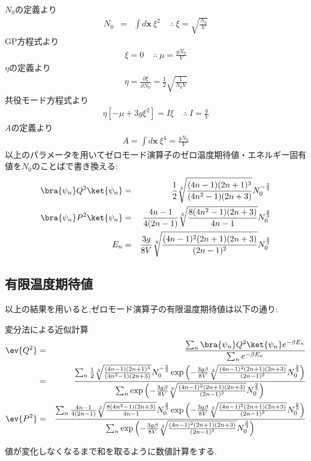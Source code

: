 \documentclass[10.5pt,a4paper]{jreport}
\begin{document}
$N_0$の定義より
\begin{eqnarray}
  N_0 &=& \int d\bm{x}\ \xi^2 \ \ \ \ \ \therefore\ \xi = \sqrt{\frac{N_0}{V}}
\end{eqnarray}
GP方程式より
\begin{eqnarray}
  [-\mu +g\xi^2]\xi = 0\ \ \ \ \ \therefore\ \mu = \frac{gN_0}{V}
\end{eqnarray}
$\eta$の定義より
\begin{eqnarray}
  \eta = \frac{\partial\xi}{\partial N_0} = \frac{1}{2}\sqrt{\frac{1}{N_0V}}
\end{eqnarray}
共役モード方程式より
\begin{eqnarray}
  \eta[-\mu + 3g\xi^2] = I\xi\ \ \ \ \ \therefore\ I = \frac{g}{V}
\end{eqnarray}
$A$の定義より
\begin{eqnarray}
  A = \int d\bm{x}\ \xi^4 = \frac{gN_0}{V}
\end{eqnarray}
以上のパラメータを用いてゼロモード演算子のゼロ温度期待値・エネルギー固有値を$N_0$のことばで書き換える:
\begin{eqnarray}
  \bra{\psi_n}Q^2\ket{\psi_n} &=& \frac{1}{2}{\sqrt[3]{\frac{(4n-1)(2n+1)^3}{(4n^2-1)(2n+3)}}}N_0^{-\frac{2}{3}}\\
  \bra{\psi_n}P^2\ket{\psi_n} &=& \frac{4n-1}{4(2n-1)}{\sqrt[3]{\frac{8(4n^2-1)(2n+3)}{4n-1}}}N_0^{\frac{2}{3}}\\
  E_n &=& \frac{3g}{8V}{\sqrt[3]{\frac{(4n-1)^2(2n+1)(2n+3)}{(2n-1)^2}}}N_0^{\frac{2}{3}}
\end{eqnarray}
\subsection{有限温度期待値}
以上の結果を用いると,ゼロモード演算子の有限温度期待値は以下の通り:
\begin{itembox}[c]{変分法による近似計算}
  \begin{eqnarray}
    \nonumber  \ev{Q^2} &=& \frac{\sum_n\bra{\psi_n}Q^2\ket{\psi_n}e^{-\beta E_n}}{\sum_ne^{-\beta E_n}}\\
    &=& \frac{\sum_n\frac{1}{2}{\sqrt[3]{\frac{(4n-1)(2n+1)^3}{(4n^2-1)(2n+3)}}}N_0^{-\frac{2}{3}}\exp{\left(-\frac{3g\beta}{8V}{\sqrt[3]{\frac{(4n-1)^2(2n+1)(2n+3)}{(2n-1)^2}}}N_0^{\frac{2}{3}}\right)}}{\sum_n\exp{\left(-\frac{3g\beta}{8V}{\sqrt[3]{\frac{(4n-1)^2(2n+1)(2n+3)}{(2n-1)^2}}}N_0^{\frac{2}{3}}\right)}}\\
    \ev{P^2} &=& \frac{\sum_n\frac{4n-1}{4(2n-1)}{\sqrt[3]{\frac{8(4n^2-1)(2n+3)}{4n-1}}}N_0^{\frac{2}{3}}\exp{\left(-\frac{3g\beta}{8V}{\sqrt[3]{\frac{(4n-1)^2(2n+1)(2n+3)}{(2n-1)^2}}}N_0^{\frac{2}{3}}\right)}}{\sum_n\exp{\left(-\frac{3g\beta}{8V}{\sqrt[3]{\frac{(4n-1)^2(2n+1)(2n+3)}{(2n-1)^2}}}N_0^{\frac{2}{3}}\right)}}
  \end{eqnarray}
\end{itembox}
値が変化しなくなるまで和を取るように数値計算をする.
\newpage
\end{document}
